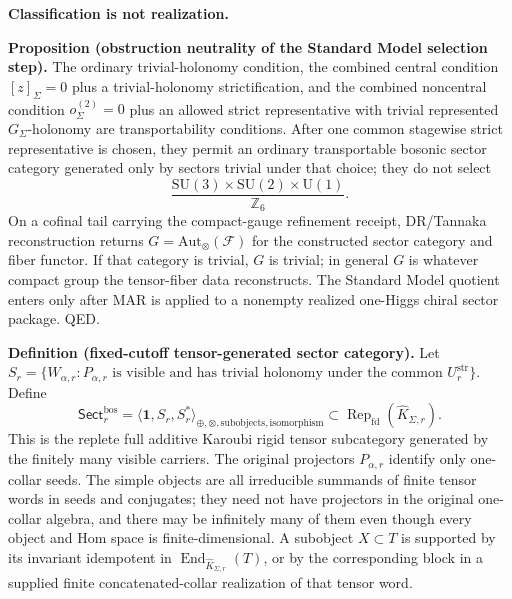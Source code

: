 \textbf{Classification is not realization.}

\textbf{Proposition (obstruction neutrality of the Standard Model selection step).} The ordinary
trivial-holonomy condition, the combined central condition \([z]_\Sigma=0\) plus a
trivial-holonomy strictification, and the combined noncentral condition \(o^{(2)}_\Sigma=0\) plus
an allowed strict representative with trivial represented \(G_\Sigma\)-holonomy are
transportability conditions. After one common stagewise strict representative is chosen, they
permit an ordinary transportable bosonic sector category generated only by sectors trivial under
that choice; they do not select
\[
\frac{\mathrm{SU}(3)\times\mathrm{SU}(2)\times\mathrm U(1)}{\mathbb Z_6}.
\]
On a cofinal tail carrying the compact-gauge refinement receipt, DR/Tannaka reconstruction returns \(G=\mathrm{Aut}_\otimes(\mathcal F)\) for the constructed
sector category and fiber functor. If that category is trivial, \(G\) is trivial; in general
\(G\) is whatever compact group the tensor-fiber data reconstructs. The Standard Model quotient
enters only after MAR is applied to a nonempty realized one-Higgs chiral sector package. QED.

\textbf{Definition (fixed-cutoff tensor-generated sector category).} Let
\(S_r=\{W_{\alpha,r}:P_{\alpha,r}\text{ is visible and has trivial holonomy under the common }U^{\mathrm{str}}_r\}\). Define
\[
\mathsf{Sect}^{\mathrm{bos}}_r
=\bigl\langle\mathbf 1,S_r,S_r^*\bigr\rangle_{
\oplus,\otimes,\mathrm{subobjects},\mathrm{isomorphism}}
\subset\operatorname{Rep}_{\mathrm{fd}}(\widehat K_{\Sigma,r}).
\]
This is the replete full additive Karoubi rigid tensor subcategory generated by the finitely many
visible carriers. The original projectors \(P_{\alpha,r}\) identify only one-collar seeds. The
simple objects are all irreducible summands of finite tensor words in seeds and conjugates; they
need not have projectors in the original one-collar algebra, and there may be infinitely many of
them even though every object and Hom space is finite-dimensional. A subobject \(X\subset T\) is
supported by its invariant idempotent in
\(\operatorname{End}_{\widehat K_{\Sigma,r}}(T)\), or by the corresponding block in a supplied
finite concatenated-collar realization of that tensor word.

